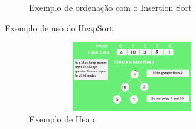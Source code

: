 

\begin{frame}{}
	\begin{figure}[h!]
		\centering    
		  \caption{Exemplo de ordenação com o Insertion Sort}
	 \end{figure} 
\end{frame}


\begin{frame}
	\begin{block}{Exemplo de uso do HeapSort}
		\begin{figure}[!htb]
			\centering	  				
			\includegraphics[height=3cm, width = 9cm]{./pic/scene01081.jpg}
			\caption{Exemplo de Heap}
		\end{figure}
	\end{block}
\end{frame}

